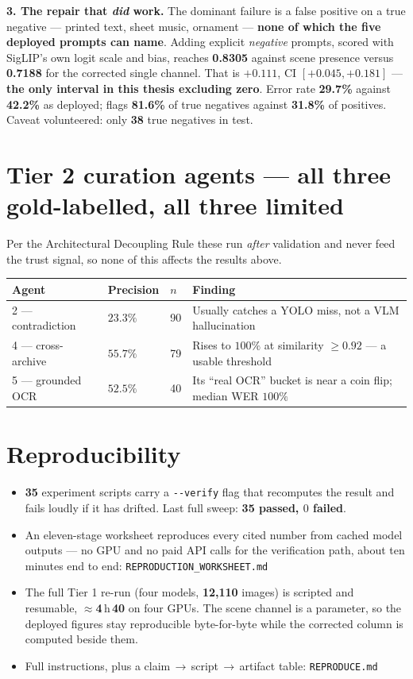 \documentclass[10pt,a4paper]{article}
\newcommand{\num}[1]{\textbf{#1}}
\begin{document}
\medskip
\textbf{3. The repair that \emph{did} work.} The dominant failure is a false positive on a true negative --- printed text, sheet music, ornament --- \textbf{none of which the five deployed prompts can name}. Adding explicit \emph{negative} prompts, scored with SigLIP's own logit scale and bias, reaches \num{0.8305} against scene presence versus \num{0.7188} for the corrected single channel. That is $+0.111$, CI $[+0.045,+0.181]$ --- \textbf{the only interval in this thesis excluding zero}. Error rate \num{29.7\%} against \num{42.2\%} as deployed; flags \num{81.6\%} of true negatives against \num{31.8\%} of positives. Caveat volunteered: only \num{38} true negatives in test.

\section{Tier 2 curation agents --- all three gold-labelled, all three limited}
Per the Architectural Decoupling Rule these run \emph{after} validation and never feed the trust signal, so none of this affects the results above.
\begin{center}\footnotesize
\begin{tabular}{l l l p{7.4cm}}
\toprule
\textbf{Agent} & \textbf{Precision} & \textbf{$n$} & \textbf{Finding} \\
\midrule
2 --- contradiction & $23.3\%$ & 90 & Usually catches a YOLO miss, not a VLM hallucination \\
4 --- cross-archive & $55.7\%$ & 79 & Rises to $100\%$ at similarity $\ge 0.92$ --- a usable threshold \\
5 --- grounded OCR & $52.5\%$ & 40 & Its ``real OCR'' bucket is near a coin flip; median WER $100\%$ \\
\bottomrule
\end{tabular}
\end{center}

\section{Reproducibility}
\begin{itemize}
  \item \num{35} experiment scripts carry a \texttt{-{}-verify} flag that recomputes the result and fails loudly if it has drifted. Last full sweep: \textbf{\num{35} passed, $0$ failed}.
  \item An eleven-stage worksheet reproduces every cited number from cached model outputs --- no GPU and no paid API calls for the verification path, about ten minutes end to end: \texttt{REPRODUCTION\_WORKSHEET.md}
  \item The full Tier 1 re-run (four models, \num{12{,}110} images) is scripted and resumable, $\approx$\num{4}\,h\,\num{40} on four GPUs. The scene channel is a parameter, so the deployed figures stay reproducible byte-for-byte while the corrected column is computed beside them.
  \item Full instructions, plus a claim\,$\rightarrow$\,script\,$\rightarrow$\,artifact table: \texttt{REPRODUCE.md}
\end{itemize}
\end{document}
